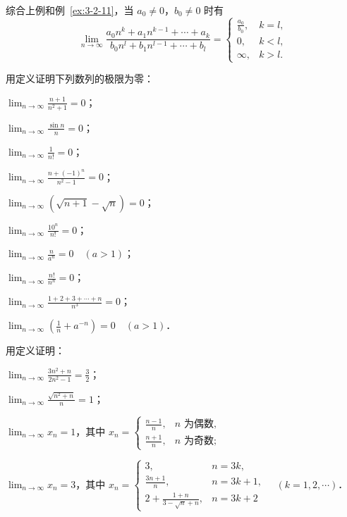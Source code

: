 综合上例和例~\ref{ex:3-2-11}，当 $a_0 \neq 0$，$b_0 \neq 0$ 时有
\[
\lim_{n\to\infty}\frac{a_0 n^k + a_1 n^{k-1} + \cdots + a_k}{b_0 n^l + b_1 n^{l-1} + \cdots + b_l} = \begin{cases}
\frac{a_0}{b_0}, & k = l,\\
0, & k < l,\\
\infty, & k > l.
\end{cases}
\]

\begin{xiti}
\item 用定义证明下列数列的极限为零：
  \begin{ziti}
  \item $\lim_{n \to \infty} \frac{n + 1}{n^2 + 1} = 0$；
  \item $\lim_{n \to \infty} \frac{\sin n}{n} = 0$；
  \item $\lim_{n \to \infty} \frac{1}{n!} = 0$；
  \item $\lim_{n \to \infty} \frac{n + (-1)^n}{n^2 - 1} = 0$；
  \item $\lim_{n \to \infty} (\sqrt{n + 1} - \sqrt{n}) = 0$；
  \item $\lim_{n \to \infty} \frac{10^n}{n!} = 0$；
  \item $\lim_{n \to \infty} \frac{n}{a^n} = 0\quad (a > 1)$；
  \item $\lim_{n \to \infty} \frac{n!}{n^n} = 0$；
  \item $\lim_{n \to \infty} \frac{1 + 2 + 3 + \cdots + n}{n^3} = 0$；
  \item $\lim_{n \to \infty} (\frac{1}{n} + a^{-n}) = 0\quad (a > 1)$．
  \end{ziti}
\item 用定义证明：
  \begin{ziti}
  \item $\lim_{n \to \infty} \frac{3n^2 + n}{2n^2 - 1} = \frac{3}{2}$；
  \item $\lim_{n \to \infty} \frac{\sqrt{n^2 + n}}{n} = 1$；
  \item $\lim_{n\to\infty}x_n = 1$，其中 $x_n = \begin{cases} \frac{n-1}{n}, & n\text{ 为偶数},\\ \frac{n+1}{n}, & n\text{ 为奇数}; \end{cases}$
  \item $\lim_{n \to \infty} x_n = 3$，其中 $x_n = \begin{cases} 3, & n = 3k,\\ \frac{3n+1}{n}, & n = 3k+1,\\ 2 + \frac{1+n}{3-\sqrt{n}+n}, & n = 3k+2 \end{cases}\quad (k=1,2,\cdots)$．

\end{ziti}
\end{xiti}
